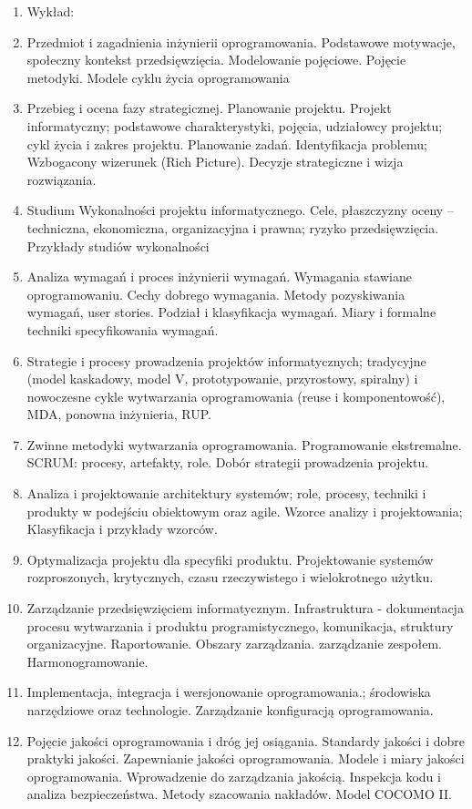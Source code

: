 \documentclass[12pt, a4paper]{article}
\begin{document}
\begin{enumerate}
  \item Wykład:
  \item Przedmiot i zagadnienia inżynierii oprogramowania. Podstawowe motywacje, społeczny kontekst przedsięwzięcia. Modelowanie pojęciowe. Pojęcie metodyki. Modele cyklu życia oprogramowania
  \item Przebieg i ocena fazy strategicznej. Planowanie projektu. Projekt informatyczny; podstawowe charakterystyki, pojęcia, udziałowcy projektu; cykl życia i zakres projektu. Planowanie zadań. Identyfikacja problemu; Wzbogacony wizerunek (Rich Picture). Decyzje strategiczne i wizja rozwiązania.
  \item Studium Wykonalności projektu informatycznego. Cele, płaszczyzny oceny –techniczna, ekonomiczna, organizacyjna i prawna; ryzyko przedsięwzięcia. Przykłady studiów wykonalności
  \item Analiza wymagań i proces inżynierii wymagań. Wymagania stawiane oprogramowaniu. Cechy dobrego wymagania. Metody pozyskiwania wymagań, user stories. Podział i klasyfikacja wymagań. Miary i formalne techniki  specyfikowania wymagań.
  \item Strategie i procesy prowadzenia projektów informatycznych; tradycyjne (model kaskadowy, model V, prototypowanie, przyrostowy, spiralny) i nowoczesne cykle wytwarzania oprogramowania (reuse i komponentowość), MDA, ponowna inżynieria, RUP.
  \item Zwinne metodyki wytwarzania oprogramowania. Programowanie ekstremalne. SCRUM: procesy, artefakty, role. Dobór strategii prowadzenia projektu.
  \item Analiza i projektowanie architektury systemów; role, procesy, techniki i produkty w podejściu obiektowym oraz agile. Wzorce analizy i projektowania; Klasyfikacja i przykłady wzorców.
  \item Optymalizacja projektu dla specyfiki produktu. Projektowanie systemów rozproszonych, krytycznych, czasu rzeczywistego i wielokrotnego użytku.
  \item Zarządzanie przedsięwzięciem informatycznym. Infrastruktura - dokumentacja procesu wytwarzania i produktu programistycznego, komunikacja, struktury organizacyjne. Raportowanie. Obszary zarządzania. zarządzanie zespołem. Harmonogramowanie.
  \item Implementacja, integracja i wersjonowanie oprogramowania.; środowiska narzędziowe oraz technologie. Zarządzanie konfiguracją oprogramowania.
  \item Pojęcie jakości oprogramowania i dróg jej osiągania. Standardy jakości i dobre praktyki jakości. Zapewnianie jakości oprogramowania. Modele i miary jakości oprogramowania. Wprowadzenie do zarządzania jakością. Inspekcja kodu i analiza bezpieczeństwa. Metody szacowania nakładów. Model COCOMO II.

\end{enumerate}
\end{document}
